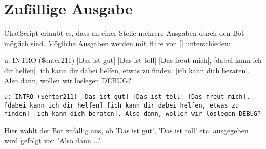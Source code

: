 \section{Zufällige Ausgabe}
\label{sec:ChatScript: Zufällige Ausgabe}

ChatScript erlaubt es, dass an einer Stelle mehrere Ausgaben durch den Bot möglich sind. Mögliche Ausgaben werden mit Hilfe von [] unterschieden:

u: INTRO (\$enter211) [Das ist gut] [Das ist toll] [Das freut mich], [dabei kann ich dir helfen] [ich kann dir dabei helfen, etwas zu finden] [ich kann dich beraten]. Also dann, wollen wir loslegen DEBUG?

\begin{lstlisting}[caption={Regel in keyexonesentence.top}]
u: INTRO ($enter211) [Das ist gut] [Das ist toll] [Das freut mich], [dabei kann ich dir helfen] [ich kann dir dabei helfen, etwas zu finden] [ich kann dich beraten]. Also dann, wollen wir loslegen DEBUG?
\end{lstlisting}

Hier wählt der Bot zufällig aus, ob 'Das ist gut', 'Das ist toll' etc. ausgegeben wird gefolgt von 'Also dann ...'.